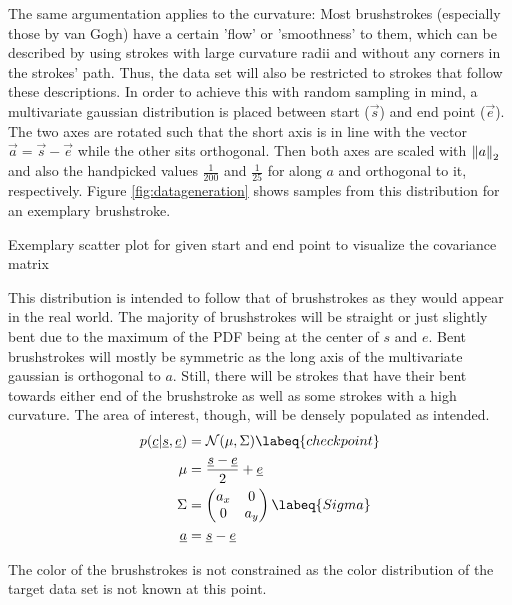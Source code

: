 The same argumentation applies to the curvature:
Most brushstrokes (especially those by van Gogh) have a certain 'flow' or 'smoothness' to them, which can be described by using strokes with large curvature radii and without any corners in the strokes' path.
Thus, the data set will also be restricted to strokes that follow these descriptions.
In order to achieve this with random sampling in mind, a multivariate gaussian distribution is placed between start ($\vec{s}$) and end point ($\vec{e}$).
The two axes are rotated such that the short axis is in line with the vector
$\vec{a} = \vec{s} - \vec{e}$ while the other sits orthogonal.
Then both axes are scaled with $\left\lVert a\right\rVert_2$ and also the handpicked values $\frac{1}{200}$ and $\frac{1}{25}$ for along $a$ and orthogonal to it, respectively.
Figure \ref{fig:datageneration} shows samples from this distribution for an exemplary brushstroke.
\begin{marginfigure}
    \resizebox{\textwidth}{!}{
        
    }
    \caption[]{Exemplary scatter plot for given start and end point to visualize the covariance matrix}
\end{marginfigure}
This distribution is intended to follow that of brushstrokes as they would appear in the real world.
The majority of brushstrokes will be straight or just slightly bent due to the maximum of the PDF being at the center of $s$ and $e$.
Bent brushstrokes will mostly be symmetric as the long axis of the multivariate gaussian is orthogonal to $a$.
Still, there will be strokes that have their bent towards either end of the brushstroke as well as some strokes with a high curvature.
The area of interest, though, will be densely populated as intended.
\begin{align}
    p(\vec{c}| \vec{s}, \vec{e}) & = \mathcal{N}(\mu, \Sigma) \labeq{checkpoint} \\
    \mu & = \frac{\vec{s} - \vec{e}}{2} + \vec{e} \\
    \Sigma & =
        \begin{pmatrix}
            a_x & 0 \\
            0 & a_y
        \end{pmatrix} \labeq{Sigma}\\
    \vec{a} & = \vec{s} - \vec{e}
\end{align}

The color of the brushstrokes is not constrained as the color distribution of the target data set is not known at this point. 



